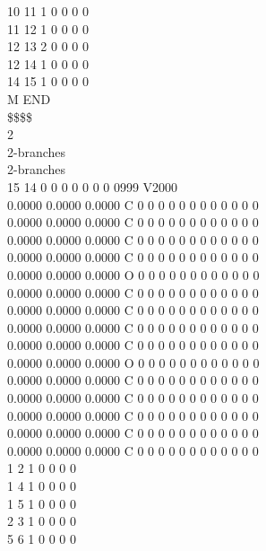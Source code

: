 \documentclass[11pt,titlepage,dvipdfmx,twoside]{article}
\begin{document}
\begin{oframed}
{ 10 11  1  0  0  0  0\\
 11 12  1  0  0  0  0\\
 12 13  2  0  0  0  0\\
 12 14  1  0  0  0  0\\
 14 15  1  0  0  0  0\\
M  END\\
\$\$\$\$\\
2\\
2-branches\\
2-branches\\
 15 14  0  0  0  0  0  0  0  0999 V2000 \\
    0.0000    0.0000    0.0000  C  0  0  0  0  0  0  0  0  0  0  0  0\\
    0.0000    0.0000    0.0000  C  0  0  0  0  0  0  0  0  0  0  0  0\\
    0.0000    0.0000    0.0000  C  0  0  0  0  0  0  0  0  0  0  0  0\\
    0.0000    0.0000    0.0000  C  0  0  0  0  0  0  0  0  0  0  0  0\\
    0.0000    0.0000    0.0000  O  0  0  0  0  0  0  0  0  0  0  0  0\\
    0.0000    0.0000    0.0000  C  0  0  0  0  0  0  0  0  0  0  0  0\\
    0.0000    0.0000    0.0000  C  0  0  0  0  0  0  0  0  0  0  0  0\\
    0.0000    0.0000    0.0000  C  0  0  0  0  0  0  0  0  0  0  0  0\\
    0.0000    0.0000    0.0000  C  0  0  0  0  0  0  0  0  0  0  0  0\\
    0.0000    0.0000    0.0000  O  0  0  0  0  0  0  0  0  0  0  0  0\\
    0.0000    0.0000    0.0000  C  0  0  0  0  0  0  0  0  0  0  0  0\\
    0.0000    0.0000    0.0000  C  0  0  0  0  0  0  0  0  0  0  0  0\\
    0.0000    0.0000    0.0000  C  0  0  0  0  0  0  0  0  0  0  0  0\\
    0.0000    0.0000    0.0000  C  0  0  0  0  0  0  0  0  0  0  0  0\\
    0.0000    0.0000    0.0000  C  0  0  0  0  0  0  0  0  0  0  0  0\\
  1  2  1  0  0  0  0\\
  1  4  1  0  0  0  0\\
  1  5  1  0  0  0  0\\
  2  3  1  0  0  0  0\\
  5  6  1  0  0  0  0\\
}
\end{oframed}
\end{document}
